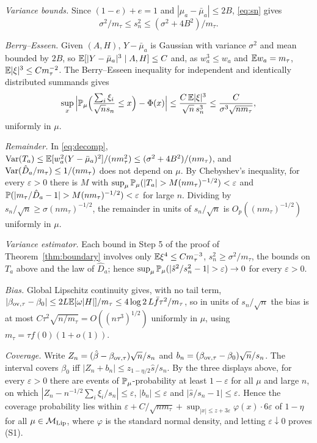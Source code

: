 \emph{Variance bounds.} Since $(1-e)+e=1$ and $|\mu_a-\bar\mu_a|\le2B$,
\eqref{eq:sn} gives
\[
\sigma^2/m_\tau\le s_n^2\le(\sigma^2+4B^2)/m_\tau .
\]

\emph{Berry--Esseen.} Given $(A,H)$, $Y-\bar\mu_a$ is Gaussian with variance
$\sigma^2$ and mean bounded by $2B$, so $\mathbb{E}[|Y-\bar\mu_a|^3\mid A,H]\le C$ and, as
$w_a^3\le w_a$ and $\mathbb{E} w_a=m_\tau$, $\mathbb{E}|\xi|^3\le Cm_\tau^{-2}$. The Berry--Esseen
inequality for independent and identically distributed summands gives
\[
\sup_x\Big|\mathbb{P}_\mu\Big(\frac{\sum_i\xi_i}{\sqrt ns_n}\le x\Big)-\Phi(x)\Big|
\le\frac{C\,\mathbb{E}|\xi|^3}{\sqrt n\,s_n^3}\le\frac{C}{\sigma^3\sqrt{nm_\tau}},
\]
uniformly in $\mu$.

\emph{Remainder.} In \eqref{eq:decomp}, $\mathrm{Var}(T_a)\le\mathbb{E}[w_a^2(Y-\bar\mu_a)^2]/(nm_\tau^2)
\le(\sigma^2+4B^2)/(nm_\tau)$, and $\mathrm{Var}(\hat D_a/m_\tau)\le1/(nm_\tau)$ does not
depend on $\mu$. By Chebyshev's inequality, for every $\varepsilon>0$ there is $M$
with $\sup_\mu\Prob_\mu(|T_a|>M(nm_\tau)^{-1/2})<\varepsilon$ and
$\Prob(|m_\tau/\hat D_a-1|>M(nm_\tau)^{-1/2})<\varepsilon$ for large $n$. Dividing by
$s_n/\sqrt n\ge\sigma(nm_\tau)^{-1/2}$, the remainder in units of $s_n/\sqrt n$ is
$O_p((nm_\tau)^{-1/2})$ uniformly in $\mu$.

\emph{Variance estimator.} Each bound in Step 5 of the proof of
Theorem~\ref{thm:boundary} involves only $\mathbb{E}\xi^4\le Cm_\tau^{-3}$, $s_n^2\ge\sigma^2/m_\tau$,
the bounds on $T_a$ above and the law of $\hat D_a$; hence
$\sup_\mu\Prob_\mu(|\hat s^2/s_n^2-1|>\varepsilon)\to0$ for every $\varepsilon>0$.

\emph{Bias.} Global Lipschitz continuity gives, with no tail term,
$|\beta_{\mathrm{ov},\tau}-\beta_0|\le2L\mathbb{E}[\omega|H|]/m_\tau\le4\log2\,L\bar f\tau^2/m_\tau$,
so in units of $s_n/\sqrt n$ the bias is at most
$C\tau^2\sqrt{n/m_\tau}=O((n\tau^3)^{1/2})$ uniformly in $\mu$, using
$m_\tau=\tau f(0)(1+o(1))$.

\emph{Coverage.} Write $Z_n=(\hat\beta-\beta_{\mathrm{ov},\tau})\sqrt n/s_n$ and
$b_n=(\beta_{\mathrm{ov},\tau}-\beta_0)\sqrt n/s_n$. The interval covers $\beta_0$ iff
$|Z_n+b_n|\le z_{1-\eta/2}\hat s/s_n$. By the three displays above, for every
$\varepsilon>0$ there are events of $\mathbb{P}_\mu$-probability at least $1-\varepsilon$
for all $\mu$ and large $n$, on which $|Z_n-n^{-1/2}\sum_i\xi_i/s_n|\le\varepsilon$,
$|b_n|\le\varepsilon$ and $|\hat s/s_n-1|\le\varepsilon$. Hence the coverage
probability lies within $\varepsilon+C/\sqrt{nm_\tau}+\sup_{|x|\le z+3\varepsilon}\varphi(x)\cdot6\varepsilon$
of $1-\eta$ for all $\mu\in\mathcal{M}_{\mathrm{Lip}}$, where $\varphi$ is the standard normal density,
and letting $\varepsilon\downarrow0$ proves (S1).

